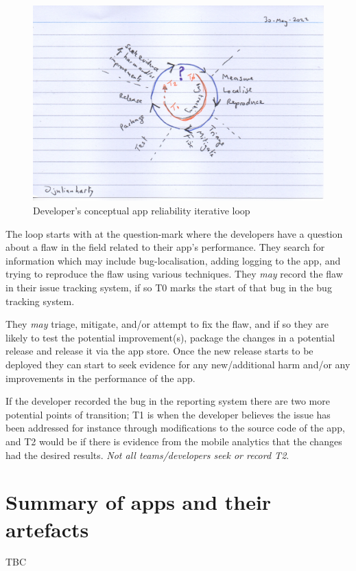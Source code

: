 \begin{figure}
    \centering
    \includegraphics[width=12cm]{images/rough-sketches/dev-app-reliability-iterative-loop.jpeg}
    \caption{Developer's conceptual app reliability iterative loop}
    \label{fig:dev-app-reliability-iterative-loop}
\end{figure}

The loop starts with at the question-mark where the developers have a question about a flaw in the field related to their app's performance. They search for information which may include bug-localisation, adding logging to the app, and trying to reproduce the flaw using various techniques. They \emph{may} record the flaw in their issue tracking system, if so T0 marks the start of that bug in the bug tracking system.

They \emph{may} triage, mitigate, and/or attempt to fix the flaw, and if so they are likely to test the potential improvement(s), package the changes in a potential release and release it via the app store. Once the new release starts to be deployed they can start to seek evidence for any new/additional harm and/or any improvements in the performance of the app.

If the developer recorded the bug in the reporting system there are two more potential points of transition; T1 is when the developer believes the issue has been addressed for instance through modifications to the source code of the app, and T2 would be if there is evidence from the mobile analytics that the changes had the desired results. \emph{Not all teams/developers seek or record T2}.


\section{Summary of apps and their artefacts}
TBC